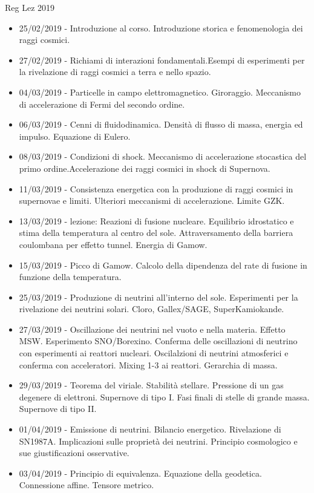 
\begin{frame}[allowframebreaks]{Reg Lez 2019}

\begin{itemize}
\item 25/02/2019 - Introduzione al corso. Introduzione storica e fenomenologia dei raggi cosmici.
\item 27/02/2019 - Richiami di interazioni fondamentali.Esempi di esperimenti per la rivelazione di raggi cosmici a terra e nello spazio.
\item 04/03/2019 - Particelle in campo elettromagnetico. Giroraggio. Meccanismo di accelerazione di Fermi del secondo ordine.
\item 06/03/2019 - Cenni di fluidodinamica. Densità di flusso di massa, energia ed impulso. Equazione di Eulero.
\item 08/03/2019 - Condizioni di shock. Meccanismo di accelerazione stocastica del primo ordine.Accelerazione dei raggi cosmici in shock di Supernova.
\item 11/03/2019 - Consistenza energetica con la produzione di raggi cosmici in supernovae e limiti. Ulteriori meccanismi di accelerazione. Limite GZK.
\item 13/03/2019 - lezione: Reazioni di fusione nucleare. Equilibrio idrostatico e stima della temperatura al centro del sole. Attraversamento della barriera coulombana per effetto tunnel. Energia di Gamow.
\item 15/03/2019 - Picco di Gamow. Calcolo della dipendenza del rate di fusione in funzione della temperatura.
\item 25/03/2019 - Produzione di neutrini all'interno del sole. Esperimenti per la rivelazione dei neutrini solari. Cloro, Gallex/SAGE, SuperKamiokande.
\item 27/03/2019 - Oscillazione dei neutrini nel vuoto e nella materia. Effetto MSW. Esperimento SNO/Borexino. Conferma delle oscillazioni di neutrino con esperimenti ai reattori nucleari. Oscilalzioni di neutrini atmosferici e conferma con acceleratori. Mixing 1-3 ai reattori. Gerarchia di massa.
\item 29/03/2019 - Teorema del viriale. Stabilità stellare. Pressione di un gas degenere di elettroni. Supernove di tipo I. Fasi finali di stelle di grande massa. Supernove di tipo II.
\item 01/04/2019 - Emissione di neutrini. Bilancio energetico. Rivelazione di SN1987A. Implicazioni sulle proprietà dei neutrini. Principio cosmologico e sue giustificazioni osservative.
\item 03/04/2019 - Principio di equivalenza. Equazione della geodetica. Connessione affine. Tensore metrico.

\end{itemize}
\end{frame}

